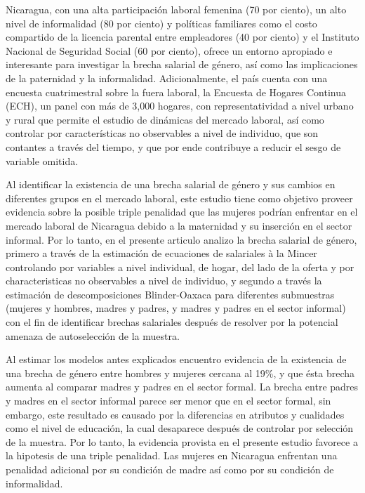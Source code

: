 Nicaragua, con una alta participación laboral femenina (70 por ciento), un alto nivel de informalidad (80 por ciento) y políticas familiares como el costo compartido de la licencia parental entre empleadores (40 por ciento) y el Instituto Nacional de Seguridad Social (60 por ciento), ofrece un entorno apropiado e interesante para investigar la brecha salarial de género, así como las implicaciones de la paternidad y la informalidad. Adicionalmente, el país cuenta con una encuesta cuatrimestral sobre la fuera laboral, la Encuesta de Hogares Continua (ECH), un panel con más de 3,000 hogares, con representatividad a nivel urbano y rural que permite el estudio de dinámicas del mercado laboral, así como controlar por características no observables a nivel de individuo, que son contantes a través del tiempo, y que por ende contribuye a reducir el sesgo de variable omitida. 
 
Al identificar la existencia de una brecha salarial de género y sus cambios en diferentes grupos en el mercado laboral, este estudio tiene como objetivo proveer evidencia sobre la posible triple penalidad que las mujeres podrían enfrentar en el mercado laboral de Nicaragua debido a la maternidad y su inserción en el sector informal. Por lo tanto, en el presente articulo analizo la brecha salarial de género, primero a través de la estimación de ecuaciones de salariales à la Mincer controlando por variables a nivel individual, de hogar, del lado de la oferta y por characteristicas no observables a nivel de individuo, y segundo a través la estimación de descomposiciones Blinder-Oaxaca para diferentes submuestras (mujeres y hombres, madres y padres, y madres y padres en el sector informal) con el fin de identificar brechas salariales después de resolver por la potencial amenaza de autoselección de la muestra. 

Al estimar los modelos antes explicados encuentro evidencia de la existencia de una brecha de género entre hombres y mujeres cercana al 19\%, y que ésta brecha aumenta al comparar madres y padres en el sector formal. La brecha entre padres y madres en el sector informal parece ser menor que en el sector formal, sin embargo, este resultado es causado por la diferencias en atributos y cualidades como el nivel de educación, la cual desaparece después de controlar por selección de la muestra. Por lo tanto, la evidencia provista en el presente estudio favorece a la hipotesis de una triple penalidad. Las mujeres en Nicaragua enfrentan una penalidad adicional por su condición de madre así como por su condición de informalidad.  

